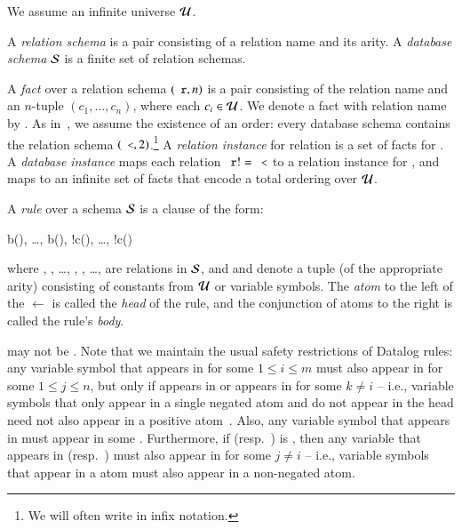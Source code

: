 We assume an infinite universe $\univ$.

A {\em relation schema} is a pair consisting of a relation name and its arity.
A {\em database schema} $\schema$ is a finite set of relation schemas.

A {\em fact} over a relation schema $(\dedalus{r}, n)$ is a pair consisting of
the relation name  and an $n$-tuple $(c_1,\ldots,c_n)$, where each
$c_i \in \univ$.  We denote a fact with relation name  by
.  As in~\cite{immerman-ptime}, we assume
the existence of an order: every database schema contains the relation schema
$(\dedalus{<},2)$.\footnote{We will often write \dedalus{<} in infix notation.}
A {\em relation instance} for relation  is a set of facts for
.  A {\em database instance} maps each relation $\dedalus{r} !=
\dedalus{<}$ to a relation instance for , and maps \dedalus{<} to an
infinite set of \dedalus{<} facts that encode a total ordering over $\univ$.

A {\em rule} over a schema $\schema$ is a clause of the form:

\begin{Drules}
        {b(), \ldots, b(), !c(), \ldots, !c()}
\end{Drules}

where , , \ldots, ,
, \ldots,  are relations in
$\schema$, and  and 
denote a tuple (of the appropriate arity) consisting of
constants from $\univ$ or variable symbols.  The {\em atom} to the left of the $\leftarrow$ is called the {\em head} of the rule, and the conjunction of atoms to the right is called the rule's {\em body}.

 may not be \dedalus{<}.  Note that we maintain the usual safety
restrictions of Datalog rules: any variable symbol  that appears in
 for some $1 \leq i \leq m$ must also appear in
 for some $1 \leq j \leq n$, but only if 
appears in  or  appears in
 for some $k \neq i$ -- i.e., variable symbols that
only appear in a single negated atom and do not appear in the head need not also
appear in a positive atom~\cite{ullmanbook}.  Also, any variable symbol  that appears in  must appear in some .
Furthermore, if  (resp.\ ) is \dedalus{<}, then any variable that appears in  (resp.\ ) must also appear in  for some $j \neq i$ -- i.e., variable symbols that appear in a \dedalus{<} atom must also appear in a non-negated atom.

